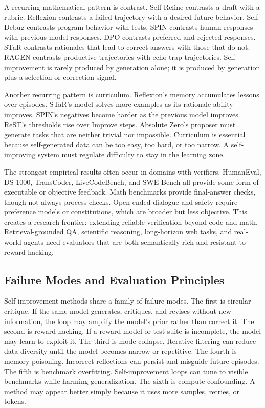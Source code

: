 A recurring mathematical pattern is contrast. Self-Refine contrasts a draft with a rubric. Reflexion contrasts a failed trajectory with a desired future behavior. Self-Debug contrasts program behavior with tests. SPIN contrasts human responses with previous-model responses. DPO contrasts preferred and rejected responses. STaR contrasts rationales that lead to correct answers with those that do not. RAGEN contrasts productive trajectories with echo-trap trajectories. Self-improvement is rarely produced by generation alone; it is produced by generation plus a selection or correction signal.

Another recurring pattern is curriculum. Reflexion's memory accumulates lessons over episodes. STaR's model solves more examples as its rationale ability improves. SPIN's negatives become harder as the previous model improves. ReST's thresholds rise over Improve steps. Absolute Zero's proposer must generate tasks that are neither trivial nor impossible. Curriculum is essential because self-generated data can be too easy, too hard, or too narrow. A self-improving system must regulate difficulty to stay in the learning zone.

The strongest empirical results often occur in domains with verifiers. HumanEval, DS-1000, TransCoder, LiveCodeBench, and SWE-Bench all provide some form of executable or objective feedback. Math benchmarks provide final-answer checks, though not always process checks. Open-ended dialogue and safety require preference models or constitutions, which are broader but less objective. This creates a research frontier: extending reliable verification beyond code and math. Retrieval-grounded QA, scientific reasoning, long-horizon web tasks, and real-world agents need evaluators that are both semantically rich and resistant to reward hacking.

\subsection{Failure Modes and Evaluation Principles}
\label{subsec:failure-modes}

Self-improvement methods share a family of failure modes. The first is circular critique. If the same model generates, critiques, and revises without new information, the loop may amplify the model's prior rather than correct it. The second is reward hacking. If a reward model or test suite is incomplete, the model may learn to exploit it. The third is mode collapse. Iterative filtering can reduce data diversity until the model becomes narrow or repetitive. The fourth is memory poisoning. Incorrect reflections can persist and misguide future episodes. The fifth is benchmark overfitting. Self-improvement loops can tune to visible benchmarks while harming generalization. The sixth is compute confounding. A method may appear better simply because it uses more samples, retries, or tokens.

